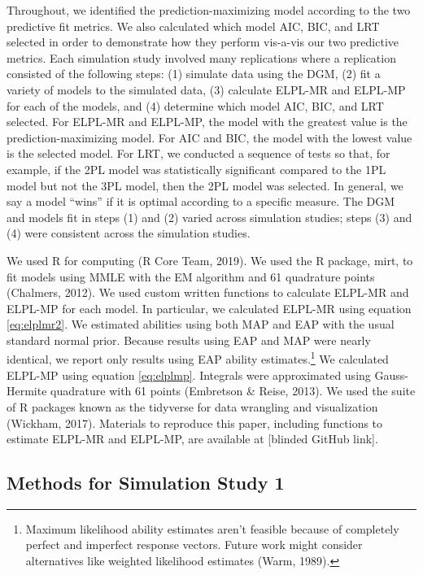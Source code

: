 \documentclass[
  english,
  man,floatsintext]{apa7}
\begin{document}
Throughout, we identified the prediction-maximizing model according to the two predictive fit metrics. We also calculated which model AIC, BIC, and LRT selected in order to demonstrate how they perform vis-a-vis our two predictive metrics. Each simulation study involved many replications where a replication consisted of the following steps: (1) simulate data using the DGM, (2) fit a variety of models to the simulated data, (3) calculate ELPL-MR and ELPL-MP for each of the models, and (4) determine which model AIC, BIC, and LRT selected. For ELPL-MR and ELPL-MP, the model with the greatest value is the prediction-maximizing model. For AIC and BIC, the model with the lowest value is the selected model. For LRT, we conducted a sequence of tests so that, for example, if the 2PL model was statistically significant compared to the 1PL model but not the 3PL model, then the 2PL model was selected. In general, we say a model ``wins'' if it is optimal according to a specific measure. The DGM and models fit in steps (1) and (2) varied across simulation studies; steps (3) and (4) were consistent across the simulation studies.

We used R for computing (R Core Team, 2019). We used the R package, mirt, to fit models using MMLE with the EM algorithm and 61 quadrature points (Chalmers, 2012). We used custom written functions to calculate ELPL-MR and ELPL-MP for each model. In particular, we calculated ELPL-MR using equation \ref{eq:elplmr2}. We estimated abilities using both MAP and EAP with the usual standard normal prior. Because results using EAP and MAP were nearly identical, we report only results using EAP ability estimates.\footnote{Maximum likelihood ability estimates aren't feasible because of completely perfect and imperfect response vectors. Future work might consider alternatives like weighted likelihood estimates (Warm, 1989).} We calculated ELPL-MP using equation \ref{eq:elplmp}. Integrals were approximated using Gauss-Hermite quadrature with 61 points (Embretson \& Reise, 2013). We used the suite of R packages known as the tidyverse for data wrangling and visualization (Wickham, 2017). Materials to reproduce this paper, including functions to estimate ELPL-MR and ELPL-MP, are available at {[}blinded GitHub link{]}.

\hypertarget{methods-for-simulation-study-1}{%
\subsection{Methods for Simulation Study 1}\label{methods-for-simulation-study-1}}
\end{document}
